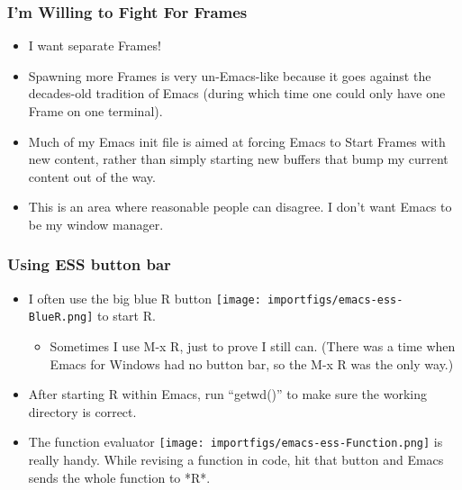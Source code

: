 \documentclass[11pt,english]{beamer}
\begin{document}
\begin{frame}[containsverbatim]
  \frametitle{I'm Willing to Fight For Frames}
  \begin{itemize}
  \item I want separate Frames!
  \item Spawning more Frames is very un-Emacs-like because it goes against
    the decades-old tradition of Emacs (during which time one could only
    have one Frame on one terminal).
  \item Much of my Emacs init file is aimed at forcing Emacs to Start Frames
    with new content, rather than simply starting new buffers that
    bump my current content out of the way.
  \item This is an area where reasonable people can disagree. I don't
    want Emacs to be my window manager.
  \end{itemize}
\end{frame}

\begin{frame}
  \frametitle{Using ESS button bar}
  \begin{itemize}
  \item I often use the big blue R button \texttt{[image: importfigs/emacs-ess-BlueR.png]}
    to start R. 

    \begin{itemize}
    \item Sometimes I use M-x R, just to prove I still can. (There was a time
      when Emacs for Windows had no button bar, so the M-x R was the only
      way.)
    \end{itemize}
  \item After starting R within Emacs, run ``getwd()'' to make sure the
    working directory is correct.
  \item The function evaluator \texttt{[image: importfigs/emacs-ess-Function.png]}
    is really handy. While revising a function in code, hit that button
    and Emacs sends the whole function to {*}R{*}.
  \end{itemize}
\end{frame}
\end{document}
